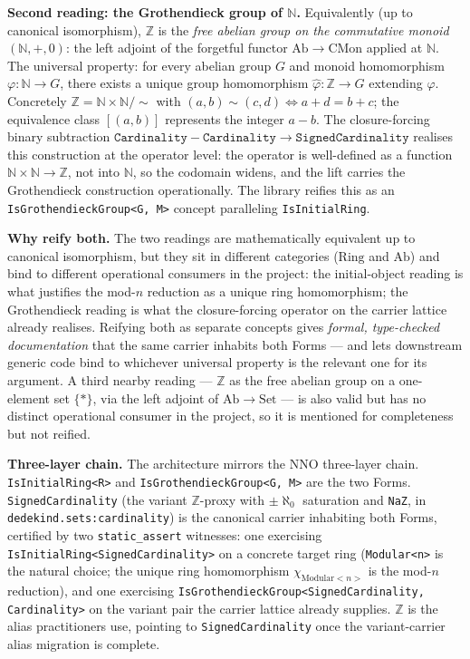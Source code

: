 \documentclass[11pt, a4paper]{report}
\begin{document}
\textbf{Second reading: the Grothendieck group of $\mathbb{N}$.} Equivalently (up to canonical isomorphism), $\mathbb{Z}$ is the \emph{free abelian group on the commutative monoid $(\mathbb{N}, +, 0)$}: the left adjoint of the forgetful functor $\mathrm{Ab} \to \mathrm{CMon}$ applied at $\mathbb{N}$. The universal property: for every abelian group $G$ and monoid homomorphism $\varphi : \mathbb{N} \to G$, there exists a unique group homomorphism $\hat\varphi : \mathbb{Z} \to G$ extending $\varphi$. Concretely $\mathbb{Z} = \mathbb{N} \times \mathbb{N} / \sim$ with $(a, b) \sim (c, d) \iff a + d = b + c$; the equivalence class $[(a, b)]$ represents the integer $a - b$. The closure-forcing binary subtraction $\texttt{Cardinality} - \texttt{Cardinality} \to \texttt{SignedCardinality}$ realises this construction at the operator level: the operator is well-defined as a function $\mathbb{N} \times \mathbb{N} \to \mathbb{Z}$, not into $\mathbb{N}$, so the codomain widens, and the lift carries the Grothendieck construction operationally. The library reifies this as an \texttt{IsGrothendieckGroup<G, M>} concept paralleling \texttt{IsInitialRing}.

\textbf{Why reify both.} The two readings are mathematically equivalent up to canonical isomorphism, but they sit in different categories ($\mathrm{Ring}$ and $\mathrm{Ab}$) and bind to different operational consumers in the project: the initial-object reading is what justifies the mod-$n$ reduction as a unique ring homomorphism; the Grothendieck reading is what the closure-forcing operator on the carrier lattice already realises. Reifying both as separate concepts gives \emph{formal, type-checked documentation} that the same carrier inhabits both Forms --- and lets downstream generic code bind to whichever universal property is the relevant one for its argument. A third nearby reading --- $\mathbb{Z}$ as the free abelian group on a one-element set $\{*\}$, via the left adjoint of $\mathrm{Ab} \to \mathrm{Set}$ --- is also valid but has no distinct operational consumer in the project, so it is mentioned for completeness but not reified.

\textbf{Three-layer chain.} The architecture mirrors the NNO three-layer chain. \texttt{IsInitialRing<R>} and \texttt{IsGrothendieckGroup<G, M>} are the two Forms. \texttt{SignedCardinality} (the variant $\mathbb{Z}$-proxy with $\pm\aleph_0$ saturation and \texttt{NaZ}, in \texttt{dedekind.sets:cardinality}) is the canonical carrier inhabiting both Forms, certified by two \texttt{static\_assert} witnesses: one exercising \texttt{IsInitialRing<SignedCardinality>} on a concrete target ring (\texttt{Modular<n>} is the natural choice; the unique ring homomorphism $\chi_{\mathrm{Modular}<n>}$ is the mod-$n$ reduction), and one exercising \texttt{IsGrothendieckGroup<SignedCardinality, Cardinality>} on the variant pair the carrier lattice already supplies. $\mathbb{Z}$ is the alias practitioners use, pointing to \texttt{SignedCardinality} once the variant-carrier alias migration is complete.
\end{document}
